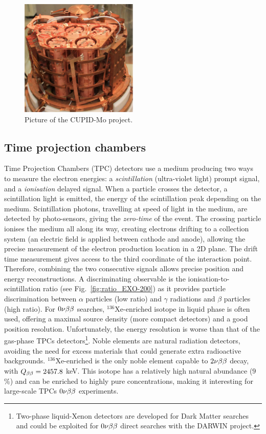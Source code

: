 \begin{figure}
  \centering
  \includegraphics[width=0.5\textwidth]{neutrinophysics/fig_neutrinophysics/CUPID-Mo.pdf}
  \caption{Picture of the CUPID-Mo project.
    \label{fig:CUPID-Mo}}
\end{figure}

\subsection{Time projection chambers}
\label{subsec:TPC}

Time Projection Chambers (TPC) detectors use a medium producing two ways to measure the electron energies: a \emph{scintillation} (ultra-violet light) prompt signal, and a \emph{ionisation} delayed signal.
When a particle crosses the detector, a scintillation light is emitted, the energy of the scintillation peak depending on the medium.
Scintillation photons, travelling at speed of light in the medium, are detected by photo-sensors, giving the \emph{zero-time} of the event.
The crossing particle ionises the medium all along its way, creating electrons drifting to a collection system (an electric field is applied between cathode and anode), allowing the precise measurement of the electron production location in a 2D plane.
The drift time measurement gives access to the third coordinate of the interaction point.
Therefore, combining the two consecutive signals allows precise position and energy reconstructions.
A discriminating observable is the ionisation-to-scintillation ratio (see Fig.~\ref{fig:ratio_EXO-200}) as it provides particle discrimination between $\alpha$ particles (low ratio) and $\gamma$ radiations and $\beta$ particles (high ratio).
For $0\nu\beta\beta$ searches, $^{136}$Xe-enriched isotope in liquid phase is often used, offering a maximal source density (more compact detectors) and a good position resolution.
Unfortunately, the energy resolution is worse than that of the gas-phase TPCs detectors\footnote{Two-phase liquid-Xenon detectors are developed for Dark Matter searches and could be exploited for $0\nu\beta\beta$ direct searches with the DARWIN project.}.
Noble elements are natural radiation detectors, avoiding the need for excess materials that could generate extra radioactive backgrounds.
$^{136}$Xe-enriched is the only noble element capable to $2\nu\beta\beta$ decay, with $Q_{\beta\beta}=2457.8$ keV.
This isotope has a relatively high natural abundance ($9$\%) and can be enriched to highly pure concentrations, making it interesting for large-scale TPCs $0\nu\beta\beta$ experiments.

